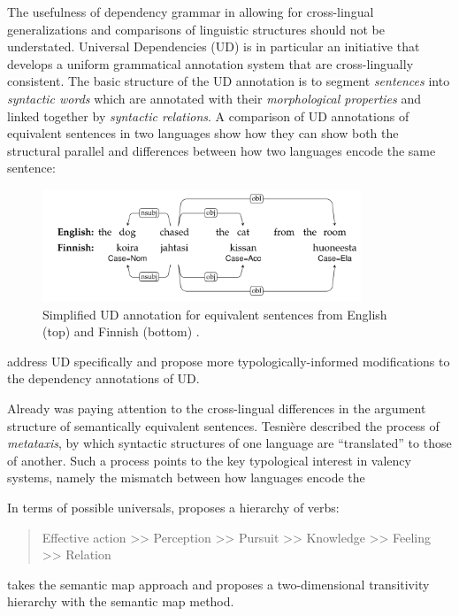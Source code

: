 The usefulness of dependency grammar in allowing for cross-lingual generalizations and comparisons of linguistic structures should not be understated. Universal Dependencies (UD) \citep{nivre2015,demarneffe2021} is in particular an initiative that develops a uniform grammatical annotation system that are cross-lingually consistent. The basic structure of the UD annotation is to segment \textit{sentences} into \textit{syntactic words} which are annotated with their \textit{morphological properties} and linked together by \textit{syntactic relations}. A comparison of UD annotations of equivalent sentences in two languages show how they can show both the structural parallel and differences between how two languages encode the same sentence:

\begin{figure}
    \includegraphics[width=0.85\textwidth]{figures/ud_example_sentence.png}
    \centering
    \caption{Simplified UD annotation for equivalent sentences from English (top) and Finnish (bottom) \citep{demarneffe2021}.}\label{fig:ud-example-sentence}
\end{figure}
 
\citet{croft2017} address UD specifically and propose more typologically-informed modifications to the dependency annotations of UD. 

Already \citet{tesniere1959} was paying attention to the cross-lingual differences in the argument structure of semantically equivalent sentences. Tesnière described the process of \textit{metataxis}, by which syntactic structures of one language are ``translated'' to those of another. Such a process points to the key typological interest in valency systems, namely the mismatch between how languages encode the  

In terms of possible universals, \citet{tsunoda1981, tsunoda1985} proposes a hierarchy of verbs:
\begin{quote}
    Effective action >> Perception >> Pursuit >> Knowledge >> Feeling >> Relation
\end{quote}
\cite{malchukov2005} takes the semantic map approach and proposes a two-dimensional transitivity hierarchy with the semantic map method.

